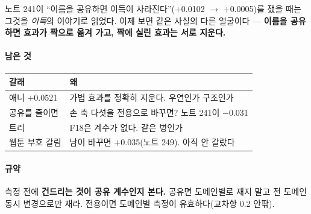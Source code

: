 \documentclass[10pt]{article}
\begin{document}
노트 241이 ``이름을 공유하면 이득이 사라진다''($+$0.0102 $\to$ $+$0.0005)를
쟀을 때는 그것을 \emph{이득}의 이야기로 읽었다. 이제 보면 같은 사실의 다른
얼굴이다 --- \textbf{이름을 공유하면 효과가 짝으로 옮겨 가고, 짝에 실린
효과는 서로 지운다.}

\paragraph{남은 것}
\begin{center}\small
\begin{tabular}{ll}
\hline
갈래 & 왜 \\
\hline
애니 $+$0.0521 & 가법 효과를 정확히 지운다. 우연인가 구조인가 \\
공유를 줄이면 & 손 축 다섯을 전용으로 바꾸면? 노트 241이 $-$0.031 \\
트리 & F18은 계수가 없다. 같은 병인가 \\
웹툰 부호 갈림 & 남이 바꾸면 $+$0.035(노트 249). 아직 안 갈랐다 \\
\hline
\end{tabular}
\end{center}

\paragraph{규약} 측정 전에 \textbf{건드리는 것이 공유 계수인지 본다.}
공유면 도메인별로 재지 말고 전 도메인 동시 변경으로만 재라. 전용이면
도메인별 측정이 유효하다(교차항 0.2 안팎).
\end{document}
